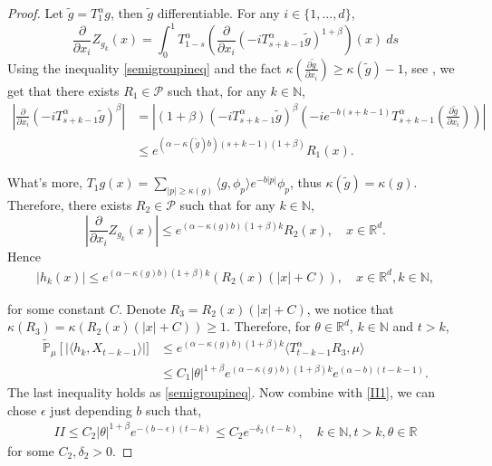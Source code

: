 \documentclass[12pt, a4paper]{amsart}
\theoremstyle{definition}
\numberwithin{equation}{section}
\begin{document}
\begin{proof}
    Let $\tilde{g}=T_1^{\alpha}g $, then $\tilde{g}$ differentiable. For any $i \in \{1,...,d\}$,
    $$\frac{\partial}{\partial x_i}Z_{g_k}(x)=\int_0^1 T^{\alpha}_{1-s}\left(\frac{\partial}{\partial x_i}(-i T_{s+k-1}^{\alpha} \tilde{g})^{1+\beta}\right)(x)~ds$$
    Using the inequality \eqref{semigroupineq} and the fact $\kappa\left(\frac{\partial \tilde{g}}{\partial x_i}\right)\geq \kappa(\tilde{g})-1$, see \cite[Lemma 2.3]{RSZ}, we get that there exists $R_1 \in \mathcal{P}$ such that, for any $k\in \mathbb{N}$,
    \begin{align*}
        \left|\frac{\partial}{\partial x_i}(-i T_{s+k-1}^{\alpha}\tilde{g})^{\beta}\right|&=\left|(1+\beta)(-i T_{s+k-1}^{\alpha}\tilde{g})^{\beta}(-i e^{-b(s+k-1)}T_{s+k-1}^{\alpha}\left(\frac{\partial \tilde{g}}{\partial x_i}\right))\right|\\
        &\leq e^{(\alpha-\kappa(\tilde{g})b)(s+k-1)(1+\beta)}R_1(x).
    \end{align*}
    
    What's more, $T_1 g(x)=\sum_{|p|\geq\kappa(g)}\langle g,\phi_p\rangle e^{-b|p|}\phi_p$, thus $\kappa(\tilde{g})=\kappa(g)$. Therefore, there exists $R_2 \in \mathcal{P}$ such that for any $k\in \mathbb{N}$,
    $$\left|\frac{\partial}{\partial x_i}Z_{g_k}(x)\right|\leq e^{(\alpha-\kappa(g)b)(1+\beta)k}R_2(x),\quad x\in \mathbb{R}^d. $$
    Hence
\begin{align}
    |h_k(x)|\leq e^{(\alpha-\kappa(g)b)(1+\beta)k}(R_2(x)(|x|+C)),\quad  x\in \mathbb{R}^d, k\in\mathbb{N},
\end{align}

for some constant $C$. Denote $R_3=R_2(x)(|x|+C)$, we notice that $\kappa(R_3)=\kappa(R_2(x)(|x|+C))\geq1$. Therefore, for $\theta\in \mathbb{R}^d$, $k\in\mathbb{N}$ and $t>k$,
\begin{align*}
  \mathbb{\tilde{P}}_{\mu}\left[|\langle h_k,X_{t-k-1}\rangle\right|]&\leq e^{(\alpha-\kappa(g)b)(1+\beta)k}\langle T_{t-k-1}^{\alpha}R_3,\mu\rangle\\
  &\leq C_1|\theta|^{1+\beta} e^{(\alpha-\kappa(g)b)(1+\beta)k}e^{(\alpha-b)(t-k-1)}.
\end{align*}
 The last inequality holds as \eqref{semigroupineq}. Now combine with \eqref{II1}, we can chose $\epsilon$ just depending $b$ such that, 
\begin{align}
    II\leq C_2|\theta|^{1+\beta} e^{-(b-\epsilon)(t-k)}\leq C_2e^{-\delta_2(t-k)},\quad k\in\mathbb{N},t>k,\theta\in\mathbb{R}\label{lemma32q}
\end{align}
for some $C_2,\delta_2>0$.


\end{proof}
\end{document}
